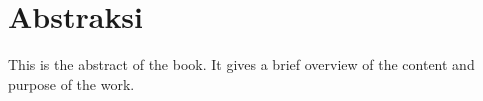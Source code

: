 \chapter*{Abstraksi}

\vspace*{-2\baselineskip}

\begin{singlespace}
  This is the abstract of the book.
  It gives a brief overview of the content and purpose of the work.

\end{singlespace}
